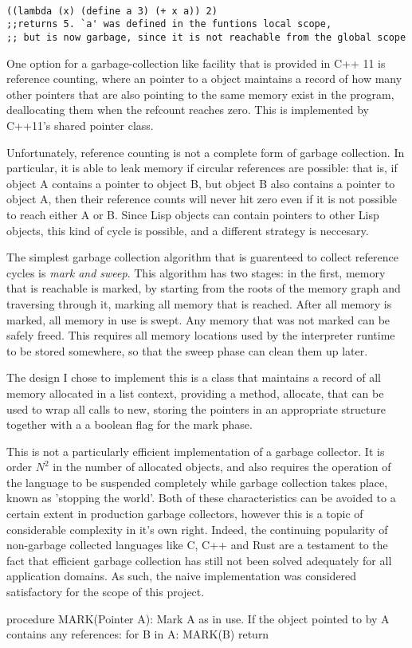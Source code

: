 \documentclass[12pt]{article}
\begin{document}
\begin{lstlisting}

((lambda (x) (define a 3) (+ x a)) 2) 
;;returns 5. `a' was defined in the funtions local scope,
;; but is now garbage, since it is not reachable from the global scope

\end{lstlisting}

One option for a garbage-collection like facility that is provided in C++ 11 is reference counting, where an pointer to a object maintains a record of how many 
other pointers that are also pointing to the same memory exist in the program, deallocating them when the refcount reaches zero. This is implemented by C++11's 
shared pointer class. 

Unfortunately, reference counting is not a complete form of garbage collection. In particular, it is able to leak memory if circular references are possible: that is, 
if object A contains a pointer to object B, but object B also contains a pointer to object A, then their reference counts will never hit zero even if it is not possible 
to reach either A or B. Since Lisp objects can contain pointers to other Lisp objects, this kind of cycle is possible, and a different strategy is neccesary. 

The simplest garbage collection algorithm that is guarenteed to collect reference cycles is \textit{mark and sweep}. This algorithm has two stages: in the first, 
memory that is reachable is marked, by starting from the roots of the memory graph and traversing through it, marking all memory that is reached. After all memory is 
marked, all memory in use is swept. Any memory that was not marked can be safely freed. This requires all memory locations used by the interpreter runtime to be 
stored somewhere, so that the sweep phase can clean them up later. 

The design I chose to implement this is a class that maintains a record of all memory allocated in a list context, providing a method, allocate, that can be used to wrap 
all calls to new, storing the pointers in an appropriate structure together with a a boolean flag for the mark phase. 

This is not a particularly efficient implementation of a garbage collector. It is order $N^2$ in the number of allocated objects, and also requires the operation of the 
language to be suspended completely while garbage collection takes place, known as 'stopping the world'. Both of these characteristics can be avoided to a certain 
extent in production garbage collectors, however this is a topic of considerable complexity in it's own right. Indeed, the continuing popularity of non-garbage collected languages like C, C++ and Rust are a testament to the fact that efficient garbage collection has still not been solved adequately for all application domains. As such, 
the naive implementation was considered satisfactory for the scope of this project.  

procedure MARK(Pointer A):
	Mark A as in use. 
	If the object pointed to by A contains any references: 
	for B in A:
		MARK(B)
	return 
\end{document}
